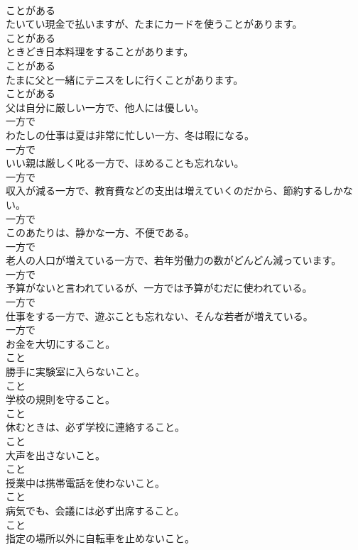 \documentclass[8pt]{extreport}
\begin{document}
\begin{CJK}{UTF8}{min}
\\	ことがある
\\	たいてい現金で払いますが、たまにカードを使うことがあります。	
\\	ことがある
\\	ときどき日本料理をすることがあります。	
\\	ことがある
\\	たまに父と一緒にテニスをしに行くことがあります。	
\\	ことがある
\\	父は自分に厳しい一方で、他人には優しい。	
\\	一方で
\\	わたしの仕事は夏は非常に忙しい一方、冬は暇になる。	
\\	一方で
\\	いい親は厳しく叱る一方で、ほめることも忘れない。	
\\	一方で
\\	収入が減る一方で、教育費などの支出は増えていくのだから、節約するしかない。	
\\	一方で
\\	このあたりは、静かな一方、不便である。	
\\	一方で
\\	老人の人口が増えている一方で、若年労働力の数がどんどん減っています。	
\\	一方で
\\	予算がないと言われているが、一方では予算がむだに使われている。	
\\	一方で
\\	仕事をする一方で、遊ぶことも忘れない、そんな若者が増えている。	
\\	一方で
\\	お金を大切にすること。	
\\	こと
\\	勝手に実験室に入らないこと。	
\\	こと
\\	学校の規則を守ること。	
\\	こと
\\	休むときは、必ず学校に連絡すること。	
\\	こと
\\	大声を出さないこと。	
\\	こと
\\	授業中は携帯電話を使わないこと。	
\\	こと
\\	病気でも、会議には必ず出席すること。	
\\	こと
\\	指定の場所以外に自転車を止めないこと。	

\end{CJK}
\end{document}
